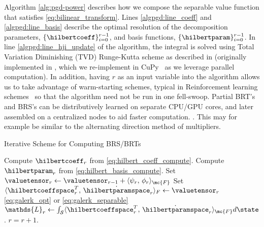 Algorithm \ref{alg:pgd-power} describes how we  compose the separable value function that satisfies \eqref{eq:bilinear_transform}. Lines \ref{algpgd:line_coeff} and \ref{algpgd:line_basis} 
describe the optimal resolution of the decomposition parameters, $\{\hilbertcoeff\}_{i=0}^{r-1}$, and basis functions, $\{\hilbertparam\}_{i=0}^{r-1}$. In line \ref{algpgd:line_hji_update} of the algorithm, the integral is solved using Total Variation Diminishing (TVD) Runge-Kutta scheme as described in \cite[\S3.5]{LevelSetsBook} (originally implemented in \cite{MitchellLSToolbox2007}, which we re-implement in CuPy~\cite{CuPy} as we leverage parallel computation). In addition, having $r$ as an input variable into the algorithm allows us to take advantage of warm-starting schemes, typical in Reinforcement learning schemes~\cite{FisacICRA} so that the algorithm need not be run in one fell-swoop. Partial BRT's and BRS's can be distributively learned on separate CPU/GPU cores, and later assembled on a centralized nodes to aid faster computation. .
This may for example be similar to the alternating direction method of multipliers.

\begin{algorithm}[tb!]
	\caption{Iterative Scheme for Computing BRS/BRTs  
		\label{alg:pgd-power}}
	\begin{algorithmic}[1]
		\State Compute $\hilbertcoeff_r$ from \eqref{eq:hilbert_coeff_compute}. %
		\label{algpgd:line_coeff}
		\State Compute $\hilbertparam_r$ from \eqref{eq:hilbert_basis_compute}. %
		\label{algpgd:line_basis}
		\State Set $\valuetensor_r \leftarrow  \valuetensor_{r-1} + \langle\psi_r,\, \phi_r \rangle_{\mc{F}}$
		\State Set $\langle \hilbertcoeffspace_r^T, \, \dot{\hilbertparamspace}_r \rangle_F \leftarrow \valuetensor_r$  \cf \eqref{eq:galerk_opt} or  \eqref{eq:galerk_separable}
		\label{algpgd:line_hji_update}
		\State $\mathds{L}_r \leftarrow \int_{\mathcal{S}} \langle \hilbertcoeffspace_r^T, \, \dot{\hilbertparamspace}_r \rangle_{\mc{F}} d\state$. 
		\State $r = r+1$.
		\EndWhile
		\State {}
		\EndFunction
	\end{algorithmic}
\end{algorithm}

